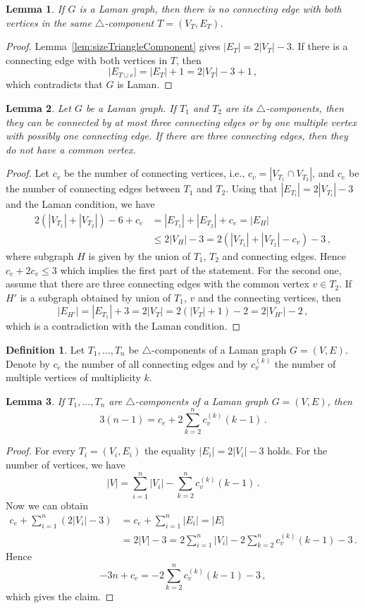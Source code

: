 \documentclass[a4paper, 11pt]{article}
\newcommand{\trcomp}{$\triangle$-component}
\newcommand{\trcomps}{$\triangle$-components}
\newcommand{\cv}[1]{c_v^{(#1)}}
\newtheorem{lem}{Lemma}[section]
\theoremstyle{definition}
\newtheorem{defn}{Definition}[section]
\begin{document}
\begin{lem}
\label{lem:noEdgeInSameComponent}
If $G$ is a Laman graph, then there is no connecting edge with both vertices in the same \trcomp{} $T=(V_T, E_T)$.
\end{lem}
\begin{proof}
Lemma~\ref{lem:sizeTriangleComponent} gives $|E_T|= 2|V_T|-3$. If there is a connecting edge with both vertices in $T$, then
$$
|E_{T\cup e}|=|E_T| +1 =2|V_T| -3+1\,,
$$
which contradicts that $G$ is Laman.
\end{proof}

\begin{lem}
\label{lem:threeEdgesOrVertexAndEdge}
Let $G$ be a Laman graph. If $T_1$ and $T_2$ are its \trcomps{}, then they can be connected by at most three connecting edges or by one multiple vertex with possibly one connecting edge. If there are three connecting edges, then they do not have a common vertex.
\end{lem}
\begin{proof}
Let $c_v$ be the number of connecting vertices, i.e., $c_v=|V_{T_1}\cap V_{T_2}|$, and $c_e$ be the number of connecting edges between $T_1$ and $T_2$. Using that $|E_{T_i}|= 2|V_{T_i}|-3$ and the Laman condition, we have
\begin{align*}
2(|V_{T_1}|+|V_{T_2}|)-6 +c_e&=|E_{T_1}|+|E_{T_2}|+c_e=|E_{H}| \\
&\leq 2|V_H| -3=2(|V_{T_1}|+|V_{T_2}|-c_v)-3\,,
\end{align*}
where subgraph $H$ is given by the union of $T_1$, $T_2$ and connecting edges. Hence $c_e+2c_v \leq 3$ which implies the first part of the statement. For the second one, assume that there are three connecting edges with the common vertex  $v\in T_2$. If $H'$ is a subgraph obtained by union of $T_1$, $v$ and the connecting vertices, then
$$
|E_{H'}|=|E_{T_1}|+3=2|V_T|=2(|V_T|+1)-2=2|V_{H'}|-2\,,
$$
which is a contradiction with the Laman condition.
\end{proof}

\begin{defn}
Let $T_1, \dots, T_n$ be \trcomps{} of a Laman graph $G=(V,E)$. Denote by $c_e$ the number of all connecting edges and by $\cv{k}$ the number of multiple vertices of multiplicity $k$.
\end{defn}

\begin{lem}
If  $T_1, \dots, T_n$ are \trcomps{} of a Laman graph $G=(V,E)$, then
$$
3(n-1)=c_e + 2\sum_{k=2}^n \cv{k}(k-1)\,.
$$
\end{lem}
\begin{proof}
For every $T_i=(V_i,E_i)$ the equality $|E_i|=2|V_i|-3$ holds. For the number of vertices, we have
$$
|V|=\sum_{i=1}^n |V_i| - \sum_{k=2}^n \cv{k}(k-1)\,.
$$
Now we can obtain
\begin{align*}
c_e+\sum_{i=1}^n (2|V_i|-3)&=c_e + \sum_{i=1}^n |E_i|= |E|\\
	&=2|V|-3 = 2\sum_{i=1}^n |V_i| - 2\sum_{k=2}^n \cv{k}(k-1) -3\,.
\end{align*}
Hence
$$-3n + c_e= - 2\sum_{k=2}^n \cv{k}(k-1) -3\,,
$$
which gives the claim.
\end{proof}
\end{document}
